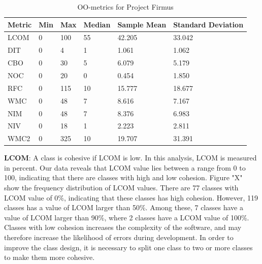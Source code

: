 \begin{table}[]
\centering
\caption{OO-metrics for Project Firmus}
\label{tab:oometrics-firmus}
\begin{tabular}{|l|l|l|l|l|l|}
\hline
\textbf{Metric} & \textbf{Min} & \textbf{Max} & \textbf{Median} & \textbf{Sample Mean} & \textbf{Standard Deviation} \\ \hline
LCOM            & 0            & 100          & 55              & 42.205               & 33.042                      \\ \hline
DIT             & 0            & 4            & 1               & 1.061                & 1.062                       \\ \hline
CBO             & 0            & 30           & 5               & 6.079                & 5.179                       \\ \hline
NOC             & 0            & 20           & 0               & 0.454                & 1.850                       \\ \hline
RFC             & 0            & 115          & 10              & 15.777               & 18.677                      \\ \hline
WMC             & 0            & 48           & 7               & 8.616                & 7.167                       \\ \hline
NIM             & 0            & 48           & 7               & 8.376                & 6.983                       \\ \hline
NIV             & 0            & 18           & 1               & 2.223                & 2.811                       \\ \hline
WMC2            & 0            & 325          & 10              & 19.707                 & 31.391                      \\ \hline
\end{tabular}
\end{table}


\textbf{LCOM}: A class is cohesive if LCOM is low. In this analysis, LCOM is measured in percent. Our data reveals that LCOM value lies between a range from 0 to 100, indicating that there are classes with high and low cohesion. Figure "X" show the frequency distribution of LCOM values. There are 77 classes with LCOM value of 0\%, indicating that these classes has high cohesion. However, 119 classes has a value of LCOM larger than 50\%. Among these, 7 classes have a value of LCOM larger than 90\%, where 2 classes have a LCOM value of 100\%. Classes with low cohesion increases the complexity of the software, and may therefore increase the likelihood of errors during development. In order to improve the class design, it is necessary to split one class to two or more classes to make them more cohesive.

